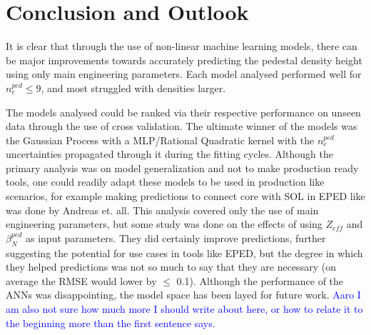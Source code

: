 \documentclass[a4paper, twoside, final, 12pt]{article}
\begin{document}
\section{Conclusion and Outlook}
It is clear that through the use of non-linear machine learning models, there can be major improvements towards accurately predicting the pedestal density height using only main engineering parameters. Each model analysed performed well for $n_e^{ped} \leq 9$, and most struggled with densities larger. 

The models analysed could be ranked via their respective performance on unseen data through the use of cross validation.
The ultimate winner of the models was the Gaussian Process with a MLP/Rational Quadratic kernel with the $n_e^{ped}$ uncertainties propagated through it during the fitting cycles.
Although the primary analysis was on model generalization and not to make production ready tools, one could readily adapt these models to be used in production like scenarios, for example making predictions to connect core with SOL in EPED like was done by Andreas et. all.
This analysis covered only the use of main engineering parameters, but some study was done on the effects of using $Z_{eff}$ and $\beta_N^{ped}$ as input parameters.
They did certainly improve predictions, further suggesting the potential for use cases in tools like EPED, but the degree in which they helped predictions was not so much to say that they are necessary (on average the RMSE would lower by $\leq$ 0.1).
Although the performance of the ANNs was disappointing, the model space has been layed for future work.
\textcolor{blue}{\@ Aaro I am also not sure how much more I should write about here, or how to relate it to the beginning more than the first sentence says.}
\end{document}
